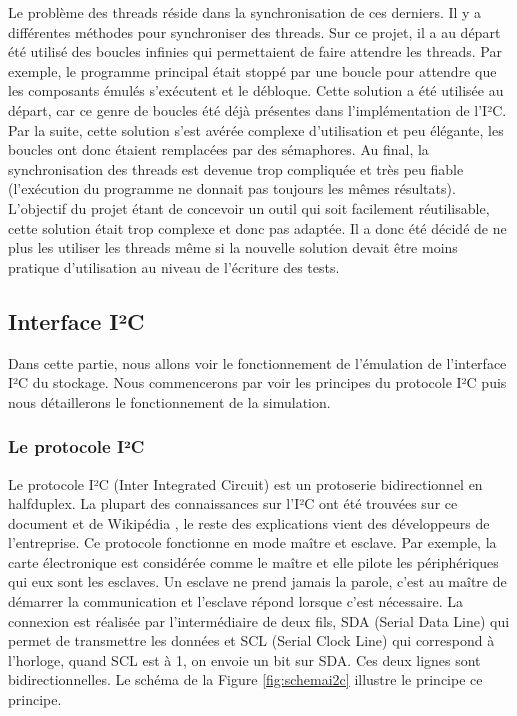 \documentclass[a4paper]{article}
\begin{document}
Le problème des threads réside dans la synchronisation de ces derniers. Il y a
différentes méthodes pour synchroniser des threads. Sur ce projet, il a au
départ été utilisé des boucles infinies qui permettaient de faire attendre les
threads. Par exemple, le programme principal était stoppé par une boucle pour
attendre que les composants émulés s'exécutent et le débloque. Cette solution
a été utilisée au départ, car ce genre de boucles été déjà présentes dans
l'implémentation de l'I²C. Par la suite, cette solution s'est avérée complexe
d'utilisation et peu élégante, les boucles ont donc étaient remplacées par des %
sémaphores. Au final, la synchronisation des threads est devenue trop compliquée
et très peu fiable (l'exécution du programme ne donnait pas toujours les mêmes
résultats). L'objectif du projet étant de concevoir un outil qui soit facilement
réutilisable, cette solution était trop complexe et donc pas adaptée. Il a donc
été décidé de ne plus les utiliser les threads même si la nouvelle solution
devait être moins pratique d'utilisation au niveau de l'écriture des tests.
\subsection{Interface I²C}%

Dans cette partie, nous allons voir le fonctionnement de l'émulation de
l'interface I²C du stockage. Nous commencerons par voir les principes du
protocole I²C puis nous détaillerons le fonctionnement de la simulation.

\subsubsection*{Le protocole I²C}

Le protocole I²C (Inter Integrated Circuit) est un \gls{protoserie}
bidirectionnel en \gls{halfduplex}. La plupart des connaissances sur l'I²C ont
été trouvées sur ce document \cite{mankar2014review} et de Wikipédia
\cite{frwiki:197726464}, le reste des explications vient des développeurs de
l'entreprise. Ce protocole fonctionne en mode maître et esclave. Par exemple, la
carte électronique est considérée comme le maître et elle pilote les
périphériques qui eux sont les esclaves. Un esclave ne prend jamais la parole,
c'est au maître de démarrer la communication et l'esclave répond lorsque c'est
nécessaire. La connexion est réalisée par l'intermédiaire de deux fils, SDA
(Serial Data Line) qui permet de transmettre les données et SCL (Serial Clock
Line) qui correspond à l'horloge, quand SCL est à 1, on envoie un bit sur SDA.
Ces deux lignes sont bidirectionnelles. Le schéma de la Figure
\ref{fig:schemai2c} illustre le principe ce principe.
\end{document}
